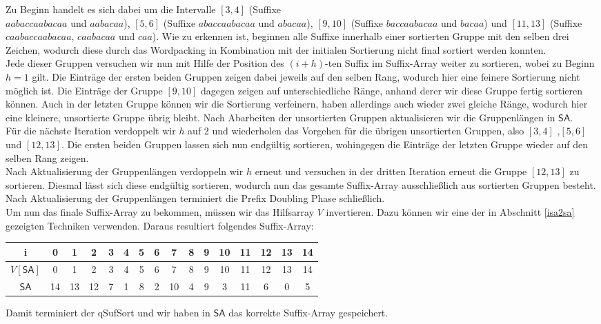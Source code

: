 Zu Beginn handelt es sich dabei um die Intervalle $[3,4]$ (Suffixe\\ $aabaccaabacaa$ und $aabacaa$), $[5,6]$ (Suffixe $abaccaabacaa$ und $abacaa$), $[9, 10]$ (Suffixe $baccaabacaa$ und $bacaa$) und $[11,13]$ (Suffixe $caabaccaabacaa$, $caabacaa$ und $caa$).
Wie zu erkennen ist, beginnen alle Suffixe innerhalb einer sortierten Gruppe mit den selben drei Zeichen, wodurch diese durch das Wordpacking in Kombination mit der initialen Sortierung nicht final sortiert werden konnten. \\
Jede dieser Gruppen versuchen wir nun mit Hilfe der Position des $(i+h)$-ten Suffix im Suffix-Array weiter zu sortieren, wobei zu Beginn $h=1$ gilt. 
Die Einträge der ersten beiden Gruppen zeigen dabei jeweils auf den selben Rang, wodurch hier eine feinere Sortierung nicht möglich ist. Die Einträge der Gruppe $[9,10]$ dagegen zeigen auf unterschiedliche Ränge, anhand derer wir diese Gruppe fertig sortieren können. Auch in der letzten Gruppe können wir die Sortierung verfeinern, haben allerdings auch wieder zwei gleiche Ränge, wodurch hier eine kleinere, unsortierte Gruppe übrig bleibt. Nach Abarbeiten der unsortierten Gruppen aktualisieren wir die Gruppenlängen in $\mathsf{SA}$.\\
Für die nächste Iteration verdoppelt wir $h$ auf 2 und wiederholen das Vorgehen für die übrigen unsortierten Gruppen, also $[3,4]$ ,$[5,6]$ und $[12,13]$. Die ersten beiden Gruppen lassen sich nun endgültig sortieren, wohingegen die Einträge der letzten Gruppe wieder auf den selben Rang zeigen.\\
Nach Aktualisierung der Gruppenlängen verdoppeln wir $h$ erneut und versuchen in der dritten Iteration erneut die Gruppe $[12,13]$ zu sortieren. Diesmal lässt sich diese endgültig sortieren, wodurch nun das gesamte Suffix-Array ausschließlich aus sortierten Gruppen besteht. Nach Aktualisierung der Gruppenlängen terminiert die Prefix Doubling Phase schließlich.\\
Um nun das finale Suffix-Array zu bekommen, müssen wir das Hilfsarray $V$ invertieren. Dazu können wir eine der in Abschnitt \ref{isa2sa} gezeigten Techniken verwenden. Daraus resultiert folgendes Suffix-Array:

\begin{center}
\begin{tabular}{| c | c | c | c | c | c | c | c | c | c | c | c | c | c | c | c |}
\hline
i & 0 & 1 &2 &3 &4 &5 &6 &7 &8 &9 &10 &11 &12 &13 &14 \\
\hline
$V[\mathsf{SA}]$ & 0 & 1 & 2 &  3 & 4 & 5 & 6 & 7 & 8 & 9 & 10 & 11 & 12 & 13 & 14 \\
$\mathsf{SA}$ & 14 & 13 & 12 & 7 & 1 & 8 & 2 & 10 & 4 & 9 & 3 & 11 & 6 & 0 & 5 \\
\hline
\end{tabular}
\end{center}

Damit terminiert der qSufSort und wir haben in $\mathsf{SA}$ das korrekte Suffix-Array gespeichert.